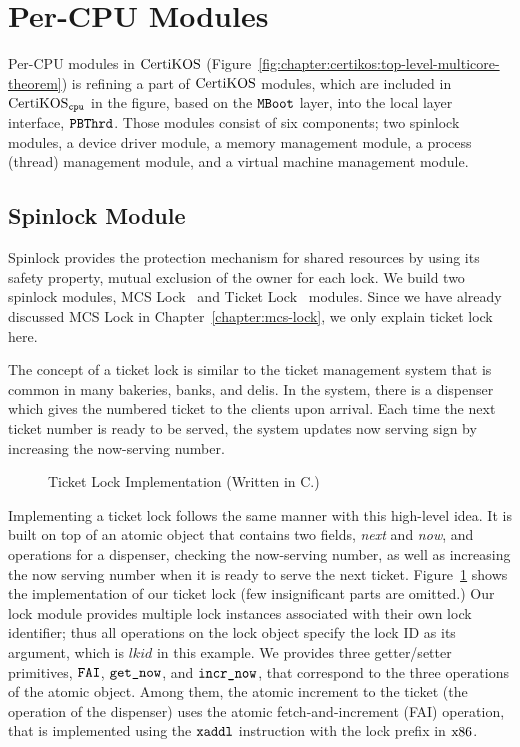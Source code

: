 \section{Per-CPU Modules}
\label{chapter:certikos:sec:per-cpu-modules}

Per-CPU modules in $\mathrm{CertiKOS}$ (Figure~\ref{fig:chapter:certikos:top-level-multicore-theorem}) is refining a part of $\mathrm{CertiKOS}$ modules,
which are included in $\mathrm{CertiKOS}_{{\mathrm{\texttt{cpu}}}}$ in the figure, based on the ${\mathrm{\texttt{MBoot}}}$ layer, 
into the local layer interface, ${\mathrm{\texttt{PBThrd}}}$.
Those modules consist of six components;
two spinlock modules, a device driver module, a memory management module,  a process (thread) management module, and a virtual machine management module. 


\subsection{Spinlock Module}
\label{chapter:certikos:subsec:spinlock-module}

Spinlock provides the protection mechanism for shared resources by using its safety property, mutual exclusion of the owner for each lock. 
We build two spinlock modules, 
MCS Lock~\cite{mcs91} and Ticket Lock~\cite{lwn:ticketlocks} modules.
Since we have already discussed MCS Lock in Chapter~\ref{chapter:mcs-lock}, 
we only explain ticket lock here.

The concept of a ticket lock is similar to the ticket management system that is common in many bakeries, banks, and delis. 
In the system, 
there is a dispenser which gives the numbered ticket to the clients upon arrival. 
Each time the next ticket number is ready to 
be served, 
the system updates now serving sign by increasing the now-serving number. 
\begin{figure}
 
\caption{Ticket Lock Implementation (Written in C.)}
\label{fig:chapter:certikos:ticket-lock-example}
\end{figure}
Implementing a ticket lock follows the same manner with this high-level idea.
It is built on top of an atomic object that contains two fields, \textit{next} and \textit{now},
and operations for a dispenser, checking the now-serving number, as well as increasing the now serving number when
it is ready to serve the next ticket. 
Figure~\ref{fig:chapter:certikos:ticket-lock-example} shows the implementation of our ticket lock (few insignificant parts are omitted.)
Our lock module provides multiple lock instances associated with their own lock identifier;
thus all operations on the lock object specify the lock ID as its argument, which is $lkid$ in this example.
We provides three getter/setter primitives, ${\mathrm{\texttt{FAI}}}$, ${\mathrm{\texttt{get\_now}}}$, and ${\mathrm{\texttt{incr\_now}}}$,
that correspond to the three operations of the atomic object.
Among them, the atomic increment to the ticket (the operation of the dispenser) 
uses the atomic fetch-and-increment (FAI) operation, that is implemented using the ${\mathrm{\texttt{xaddl}}}$ instruction with the 
lock prefix in $\mathrm{x86}$.

